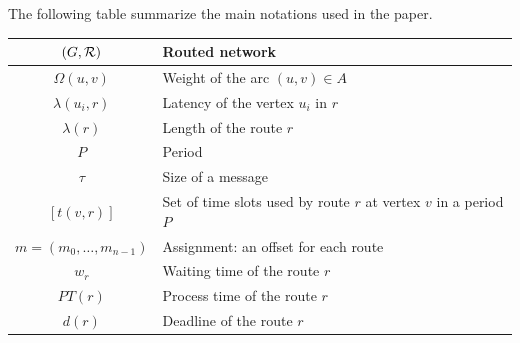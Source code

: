 \documentclass[10pt]{article}
\begin{document}
     
      The following table summarize the main notations used in the paper.
      \begin{center}
   \begin{tabularx}{0.5\textwidth}{|c|X|}
    \hline
     $(G,\cal R)$ & Routed network \\
     \hline
      $\Omega(u,v)$ & Weight of the arc $(u,v) \in A$ \\
      \hline
      $\lambda(u_i,r)$ & Latency of the vertex $u_i$ in $r$\\
         \hline
         $\lambda(r)$ & Length of the route $r$\\
         \hline
         $P$ & Period\\
         \hline
         $\tau$ & Size of a message\\
         \hline
         $ [t(v,r)]$& Set of time slots used by route $r$ at vertex $v$ in a period $P$\\
         \hline 
         $m=(m_0, \ldots ,m_{n-1})$& Assignment: an offset for each route\\
              \hline 
         $w_r$& Waiting time of the route $r$\\
            \hline 
         $PT(r)$& Process time of the route $r$\\
           \hline 
       $d(r)$ & Deadline of the route $r$\\
    \hline

      \end{tabularx}
      \end{center}



\end{document}
